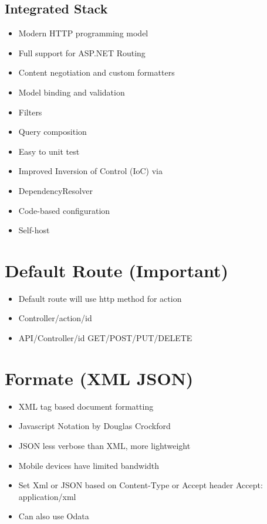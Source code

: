 \documentclass[a4paper,10pt]{scrreprt}
\begin{document}
\subsection{Integrated Stack}
\begin{itemize}
 \item Modern HTTP programming model
\item Full support for ASP.NET Routing
\item Content negotiation and custom formatters
\item Model binding and validation
\item Filters
\item Query composition
\item Easy to unit test
\item Improved Inversion of Control (IoC) via
\item DependencyResolver
\item Code-based configuration
\item Self-host
\end{itemize}

\section{Default Route (Important)}
\begin{framed}
 \begin{itemize}
  \item Default route will use http method for action
\item Controller/action/id
\item API/Controller/id GET/POST/PUT/DELETE
 \end{itemize}

\end{framed}

\section{Formate (XML JSON)}
\begin{itemize}
 \item XML tag based document formatting
\item Javascript Notation by Douglas Crockford
\item JSON less verbose than XML, more lightweight
\item Mobile devices have limited bandwidth
\item Set Xml or JSON based on Content-Type or Accept
header
\subitem Accept: application/xml
\item Can also use Odata
\end{itemize}
\end{document}
